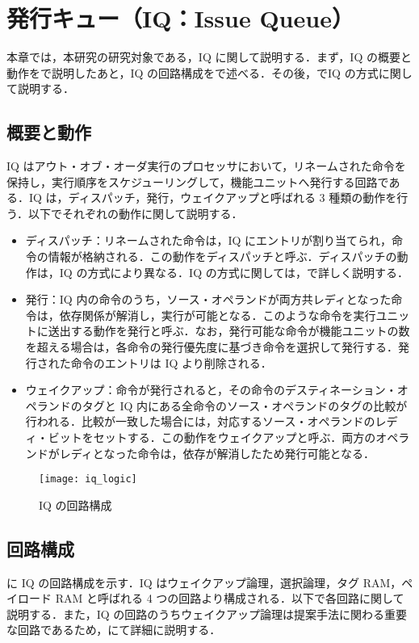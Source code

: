 
\chapter{発行キュー（IQ：Issue Queue）}
\label{sec:basic_IQ}
本章では，本研究の研究対象である，IQ に関して説明する．まず，IQ の概要と動作をで説明したあと，IQ の回路構成をで述べる．その後，でIQ の方式に関して説明する．

\section{概要と動作}
\label{sec:iq_abst}
IQ はアウト・オブ・オーダ実行のプロセッサにおいて，リネームされた命令を保持し，実行順序をスケジューリングして，機能ユニットへ発行する回路である．IQ は，ディスパッチ，発行，ウェイクアップと呼ばれる 3 種類の動作を行う．以下でそれぞれの動作に関して説明する．

\begin{itemize}
  \item ディスパッチ：リネームされた命令は，IQ にエントリが割り当てられ，命令の情報が格納される．この動作をディスパッチと呼ぶ．ディスパッチの動作は，IQ の方式により異なる．IQ の方式に関しては，で詳しく説明する．
  \item 発行：IQ 内の命令のうち，ソース・オペランドが両方共レディとなった命令は，依存関係が解消し，実行が可能となる．このような命令を実行ユニットに送出する動作を発行と呼ぶ．なお，発行可能な命令が機能ユニットの数を超える場合は，各命令の発行優先度に基づき命令を選択して発行する．発行された命令のエントリは IQ より削除される． 
  \item ウェイクアップ：命令が発行されると，その命令のデスティネーション・オペランドのタグと IQ 内にある全命令のソース・オペランドのタグの比較が行われる．比較が一致した場合には，対応するソース・オペランドのレディ・ビットをセットする．この動作をウェイクアップと呼ぶ．両方のオペランドがレディとなった命令は，依存が解消したため発行可能となる．
\end{itemize}

\begin{figure}[htb]
  \centering
  \texttt{[image: iq\_logic]}
  \caption{IQ の回路構成}
  \label{fig:iq_logic}
\end{figure}

\section{回路構成}
\label{sec:iq_circuit}
に IQ の回路構成を示す．IQ はウェイクアップ論理，選択論理，タグ RAM，ペイロード RAM と呼ばれる 4 つの回路より構成される．以下で各回路に関して説明する．また，IQ の回路のうちウェイクアップ論理は提案手法に関わる重要な回路であるため，にて詳細に説明する．

